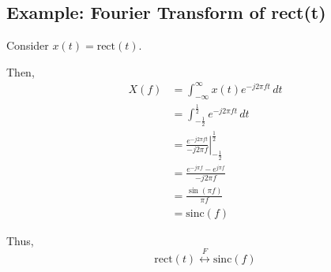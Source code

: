\subsection{Example: Fourier Transform of rect(t)}
\begin{example}
    Consider \( x(t) = \text{rect}(t) \).

    Then,
    \begin{align*}
        X(f) &= \int_{-\infty}^{\infty} x(t) e^{-j 2 \pi f t} \, dt \\
             &= \int_{-\frac{1}{2}}^{\frac{1}{2}} e^{-j 2 \pi f t} \, dt \\
             &= \left. \frac{e^{-j 2 \pi f t}}{-j 2 \pi f} \right|_{-\frac{1}{2}}^{\frac{1}{2}} \\
             &= \frac{e^{-j \pi f} - e^{j \pi f}}{-j 2 \pi f} \\
             &= \frac{\sin(\pi f)}{\pi f} \\
             &= \text{sinc}(f)
    \end{align*}
    
    Thus,
    \[
    \text{rect}(t) \overset{F}{\leftrightarrow} \text{sinc}(f)
    \]
\end{example}


